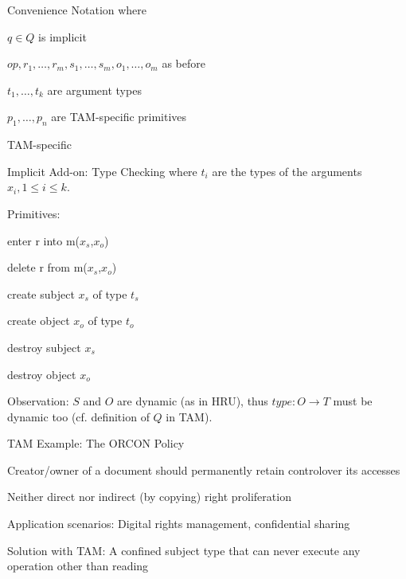 \documentclass[a4paper]{article}
\begin{document}
\begin{multicols}{3}
    Convenience Notation where
    \begin{itemize*}
        \item $q\in Q$ is implicit
        \item $op,r_1 ,\dots ,r_m,s_1 ,\dots ,s_m,o_1 ,\dots ,o_m$ as before
        \item $t_1 ,\dots ,t_k$ are argument types
        \item $p_1 ,\dots ,p_n$ are TAM-specific primitives
    \end{itemize*}

    TAM-specific
    \begin{itemize*}
        \item Implicit Add-on: Type Checking where $t_i$ are the types of the arguments $x_i, 1\leq i\leq k$.
        \item Primitives:
        \begin{itemize*}
            \item enter r into m($x_s$,$x_o$)
            \item delete r from m($x_s$,$x_o$)
            \item create subject $x_s$ of type $t_s$
            \item create object $x_o$ of type $t_o$
            \item destroy subject $x_s$
            \item destroy object $x_o$
        \end{itemize*}
        \item Observation: $S$ and $O$ are dynamic (as in HRU), thus $type:O\rightarrow T$ must be dynamic too (cf. definition of $Q$ in TAM).
    \end{itemize*}

    TAM Example: The ORCON Policy
    \begin{itemize*}
        \item Creator/owner of a document should permanently retain controlover its accesses
        \item Neither direct nor indirect (by copying) right proliferation
        \item Application scenarios: Digital rights management, confidential sharing
        \item Solution with TAM: A confined subject type that can never execute any operation other than reading
    \end{itemize*}


\end{multicols}
\end{document}
